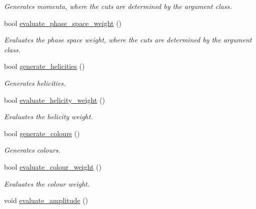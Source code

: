 \begin{DoxyCompactItemize}
\begin{DoxyCompactList}\small\item\em Generates momenta, where the cuts are determined by the argument class. \end{DoxyCompactList}\item 
bool \hyperlink{a00436_a394dbe0bd27ced566ea1728a5fda64b6}{evaluate\+\_\+phase\+\_\+space\+\_\+weight} ()
\begin{DoxyCompactList}\small\item\em Evaluates the phase space weight, where the cuts are determined by the argument class. \end{DoxyCompactList}\item 
\hypertarget{a00436_a5682990085a2cb028d5f3b1369e2761c}{}bool \hyperlink{a00436_a5682990085a2cb028d5f3b1369e2761c}{generate\+\_\+helicities} ()\label{a00436_a5682990085a2cb028d5f3b1369e2761c}

\begin{DoxyCompactList}\small\item\em Generates helicities. \end{DoxyCompactList}\item 
\hypertarget{a00436_a378751f56ee46c3a268b7a7c6da1481f}{}bool \hyperlink{a00436_a378751f56ee46c3a268b7a7c6da1481f}{evaluate\+\_\+helicity\+\_\+weight} ()\label{a00436_a378751f56ee46c3a268b7a7c6da1481f}

\begin{DoxyCompactList}\small\item\em Evaluates the helicity weight. \end{DoxyCompactList}\item 
\hypertarget{a00436_a15bab9146b168baa970367df22a435d3}{}bool \hyperlink{a00436_a15bab9146b168baa970367df22a435d3}{generate\+\_\+colours} ()\label{a00436_a15bab9146b168baa970367df22a435d3}

\begin{DoxyCompactList}\small\item\em Generates colours. \end{DoxyCompactList}\item 
\hypertarget{a00436_ac3ea54ae2ecadc28d34074dff354db2b}{}bool \hyperlink{a00436_ac3ea54ae2ecadc28d34074dff354db2b}{evaluate\+\_\+colour\+\_\+weight} ()\label{a00436_ac3ea54ae2ecadc28d34074dff354db2b}

\begin{DoxyCompactList}\small\item\em Evaluates the colour weight. \end{DoxyCompactList}\item 
\hypertarget{a00436_ad4abb467c413001ed3b65063a84660de}{}void \hyperlink{a00436_ad4abb467c413001ed3b65063a84660de}{evaluate\+\_\+amplitude} ()\label{a00436_ad4abb467c413001ed3b65063a84660de}


\end{DoxyCompactItemize}
